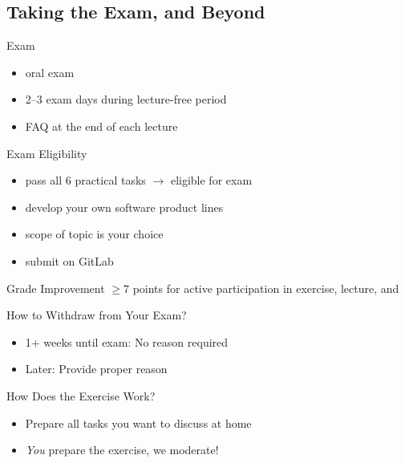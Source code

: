 

\subsection{Taking the Exam, and Beyond}

\begin{frame}[label=Exam]{\myframetitle}
	\begin{mycolumns}
		\begin{definition}{Exam}
			\begin{itemize}
				\item oral exam %
				\item 2--3 exam days during lecture-free period
				\item FAQ at the end of each lecture
			\end{itemize}
		\end{definition}
		\begin{definition}{Exam Eligibility } %
			\begin{itemize}
				\item pass all 6 practical tasks $\rightarrow$ eligible for exam
				\item develop your own software product lines
				\item scope of topic is your choice
				\item submit on GitLab
			\end{itemize}
		\end{definition}
		\begin{definition}{Grade Improvement } %
			$\geq 7$ points for active participation in exercise, lecture, and \Panda
		\end{definition}
	\mynextcolumn
		
		\begin{note}{How to Withdraw from Your Exam?}
			\begin{itemize}
				\item 1+ weeks until exam: No reason required
				\item Later: Provide proper reason
			\end{itemize}
		\end{note}	

		\begin{note}{How Does the Exercise Work?}
			\begin{itemize}
				\item Prepare all tasks you want to discuss at home
				\item \emph{You} prepare the exercise, we moderate!
			\end{itemize}
		\end{note}


\end{mycolumns}
\end{frame}
